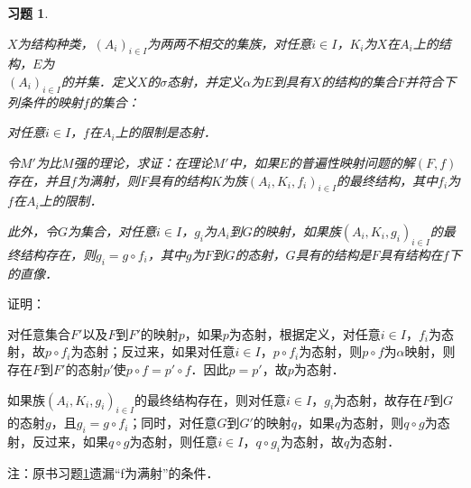 \documentclass[12pt, a4paper, oneside]{book}
\newtheorem{exer}{习题}
\begin{document}
			\begin{exer}\label{exer212}
				\hfill\par
				$X$为结构种类，$(A_i)_{i\in I}$为两两不相交的集族，对任意$i\in I$，$K_i$为$X$在$A_i$上的结构，$E$为\\$(A_i)_{i\in I}$的并集．定义$X$的$\sigma$态射，并定义$\alpha$为$E$到具有$X$的结构的集合$F$并符合下列条件的映射$f$的集合：
				\par
				对任意$i\in I$，$f$在$A_i$上的限制是态射．
				\par
				令$M'$为比$M$强的理论，求证：在理论$M'$中，如果$E$的普遍性映射问题的解$(F, f)$存在，并且$f$为满射，则$F$具有的结构$K$为族$(A_i, K_i, f_i)_{i\in I}$的最终结构，其中$f_i$为$f$在$A_i$上的限制．
				\par
				此外，令$G$为集合，对任意$i\in I$，$g_i$为$A_i$到$G$的映射，如果族$(A_i, K_i, g_i)_{i\in I}$的最终结构存在，则$g_i=g\circ f_i$，其中$g$为$F$到$G$的态射，$G$具有的结构是$F$具有结构在$f$下的直像．
			\end{exer}
			证明：
			\par
			对任意集合$F'$以及$F$到$F'$的映射$p$，如果$p$为态射，根据定义，对任意$i\in I$，$f_i$为态射，故$p\circ f_i$为态射；反过来，如果对任意$i\in I$，$p\circ f_i$为态射，则$p\circ f$为$\alpha$映射，则存在$F$到$F'$的态射$p'$使$p\circ f=p'\circ f$．因此$p=p'$，故$p$为态射．
			\par
			如果族$(A_i, K_i, g_i)_{i\in I}$的最终结构存在，则对任意$i\in I$，$g_i$为态射，故存在$F$到$G$的态射$g$，且$g_i=g\circ f_i$；同时，对任意$G$到$G'$的映射$q$，如果$q$为态射，则$q\circ g$为态射，反过来，如果$q\circ g$为态射，则任意$i\in I$，$q\circ g_i$为态射，故$q$为态射．
			\par
			注：原书习题\ref{exer212}遗漏“f为满射”的条件．
\end{document}
